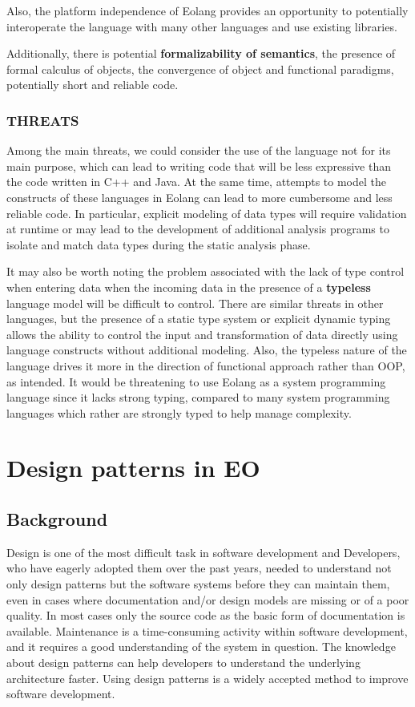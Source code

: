 \documentclass[12pt]{book}
\begin{document}
{{Also, the platform independence of Eolang provides an opportunity to potentially interoperate the language with many other languages and use existing libraries.

Additionally, there is potential \textbf{formalizability of semantics}, the presence of formal calculus of objects, the convergence of object and functional paradigms, potentially short and reliable code.

\subsection{THREATS}
Among the main threats, we could consider the use of the language not for its main purpose, which can lead to writing code that will be less expressive than the code written in C++ and Java. At the same time, attempts to model the constructs of these languages in Eolang can lead to more cumbersome and less reliable code. In particular, explicit modeling of data types will require validation at runtime or may lead to the development of additional analysis programs to isolate and match data types during the static analysis phase.

It may also be worth noting the problem associated with the lack of type control when entering data when the incoming data in the presence of a \textbf{typeless} language model will be difficult to control. There are similar threats in other languages, but the presence of a static type system or explicit dynamic typing allows the ability to control the input and transformation of data directly using language constructs without additional modeling. Also, the typeless nature of the language drives it more in the direction of functional approach rather than OOP, as intended. It would be threatening to use Eolang as a system programming language since it lacks strong typing, compared to many system programming languages which rather are strongly typed to help manage complexity.

\chapter{Design patterns in EO}

\section{Background}
Design is one of the most difficult task in software development  and Developers, who have eagerly adopted them over the past years, needed to understand not only design patterns but the software systems before they can maintain them, even in cases where documentation and/or design models are missing or of a poor quality. In most cases only the source code as the basic form of documentation is available. Maintenance is a time-consuming activity within software development, and it requires a good understanding of the system in question. The knowledge about design patterns can help developers to understand the underlying architecture faster. Using design patterns is a widely accepted method to improve software development.

}}
\end{document}

